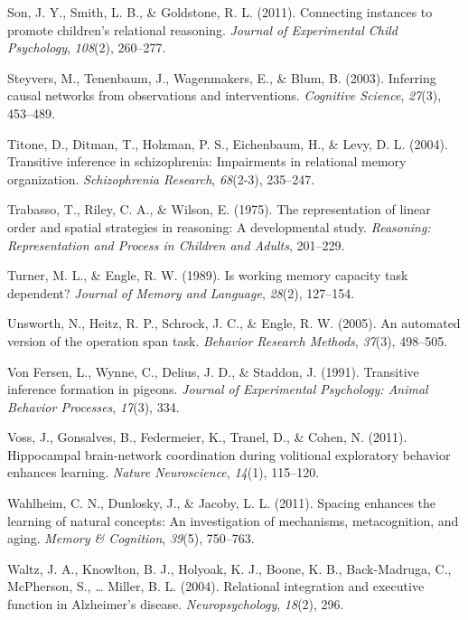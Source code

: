 \documentclass[floatsintext,man]{apa6}
\theoremstyle{definition}
\theoremstyle{definition}
\theoremstyle{definition}
\theoremstyle{remark}
\begin{document}
\hypertarget{ref-son2011connecting}{}
Son, J. Y., Smith, L. B., \& Goldstone, R. L. (2011). Connecting
instances to promote children's relational reasoning. \emph{Journal of
Experimental Child Psychology}, \emph{108}(2), 260--277.

\hypertarget{ref-Steyvers:2003vk}{}
Steyvers, M., Tenenbaum, J., Wagenmakers, E., \& Blum, B. (2003).
Inferring causal networks from observations and interventions.
\emph{Cognitive Science}, \emph{27}(3), 453--489.

\hypertarget{ref-titone2004transitive}{}
Titone, D., Ditman, T., Holzman, P. S., Eichenbaum, H., \& Levy, D. L.
(2004). Transitive inference in schizophrenia: Impairments in relational
memory organization. \emph{Schizophrenia Research}, \emph{68}(2-3),
235--247.

\hypertarget{ref-trabasso1975representation}{}
Trabasso, T., Riley, C. A., \& Wilson, E. (1975). The representation of
linear order and spatial strategies in reasoning: A developmental study.
\emph{Reasoning: Representation and Process in Children and Adults},
201--229.

\hypertarget{ref-turner1989working}{}
Turner, M. L., \& Engle, R. W. (1989). Is working memory capacity task
dependent? \emph{Journal of Memory and Language}, \emph{28}(2),
127--154.

\hypertarget{ref-unsworth2005automated}{}
Unsworth, N., Heitz, R. P., Schrock, J. C., \& Engle, R. W. (2005). An
automated version of the operation span task. \emph{Behavior Research
Methods}, \emph{37}(3), 498--505.

\hypertarget{ref-von1991transitive}{}
Von Fersen, L., Wynne, C., Delius, J. D., \& Staddon, J. (1991).
Transitive inference formation in pigeons. \emph{Journal of Experimental
Psychology: Animal Behavior Processes}, \emph{17}(3), 334.

\hypertarget{ref-voss2010hippocampal}{}
Voss, J., Gonsalves, B., Federmeier, K., Tranel, D., \& Cohen, N.
(2011). Hippocampal brain-network coordination during volitional
exploratory behavior enhances learning. \emph{Nature Neuroscience},
\emph{14}(1), 115--120.

\hypertarget{ref-wahlheim2011spacing}{}
Wahlheim, C. N., Dunlosky, J., \& Jacoby, L. L. (2011). Spacing enhances
the learning of natural concepts: An investigation of mechanisms,
metacognition, and aging. \emph{Memory \& Cognition}, \emph{39}(5),
750--763.

\hypertarget{ref-waltz2004relational}{}
Waltz, J. A., Knowlton, B. J., Holyoak, K. J., Boone, K. B.,
Back-Madruga, C., McPherson, S., \ldots{} Miller, B. L. (2004).
Relational integration and executive function in Alzheimer's disease.
\emph{Neuropsychology}, \emph{18}(2), 296.
\end{document}
